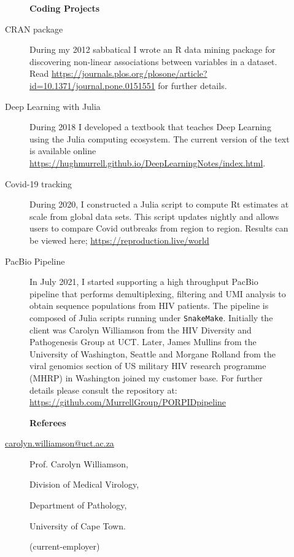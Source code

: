 \documentclass[12pt]{article}
\begin{document}
\newpage
\begin{multicols}{2}

\begin{description}\item[] \begin{description}\item[] {\large \bf  Coding Projects }
\item[CRAN package ]
	During my 2012 sabbatical I wrote an R data mining package for discovering
	non-linear associations between variables in a dataset. Read 
	\url{https://journals.plos.org/plosone/article?id=10.1371/journal.pone.0151551}       
	for further details.
\item[Deep Learning with Julia]
        During 2018 I developed a textbook 
        that teaches Deep Learning using the Julia computing ecosystem. 
        The current version of the text is available online \url{https://hughmurrell.github.io/DeepLearningNotes/index.html}.
\item[Covid-19 tracking ]
	During 2020, I constructed a Julia script
	to compute Rt estimates at scale from global data sets. This script updates
	nightly and allows users to compare Covid outbreaks from region to region.
	Results can be viewed here; \url{https://reproduction.live/world}
 \item[ PacBio Pipeline   ]  In July 2021, I started supporting a high throughput 
 	PacBio pipeline that performs demultiplexing, filtering and UMI analysis 
	to obtain sequence populations from HIV patients. The pipeline is composed 
	of Julia scripts running under {\tt SnakeMake}.
 	Initially the client was Carolyn Williamson from the HIV Diversity and 
	Pathogenesis Group at UCT. Later, James Mullins from the University of 
	Washington, Seattle and Morgane Rolland from the viral genomics section 
	of US military HIV research programme (MHRP) in Washington
 	joined my customer base. For further details please consult the
	repository at: \url{https://github.com/MurrellGroup/PORPIDpipeline}
	
 \end{description}
\end{description}


\begin{description}\item[] \begin{description}\item[] {\large \bf  Referees  }

\item[\url{carolyn.williamson@uct.ac.za}] 
 \item[] Prof. Carolyn Williamson, 
 \item[] Division of Medical Virology, 
 \item[] Department of Pathology, 
 \item[] University of Cape Town.
\item[] (current-employer)
\item[]


\end{description}
\end{description}
\end{multicols}
\end{document}
